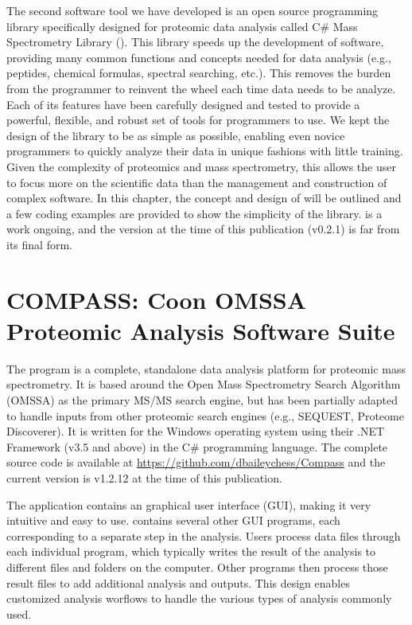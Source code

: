 The second software tool we have developed is an open source programming library specifically designed for proteomic data analysis called C\# Mass Spectrometry Library (\csmsl{}). This library speeds up the development of software, providing many common functions and concepts needed for data analysis (e.g., peptides, chemical formulas, spectral searching, etc.). This removes the burden from the programmer to reinvent the wheel each time data needs to be analyze. Each of its features have been carefully designed and tested to provide a powerful, flexible, and robust set of tools for programmers to use. We kept the design of the library to be as simple as possible, enabling even novice programmers to quickly analyze their data in unique fashions with little training. Given the complexity of proteomics and mass spectrometry, this allows the user to focus more on the scientific data than the management and construction of complex software. In this chapter, the concept and design of \csmsl{} will be outlined and a few coding examples are provided to show the simplicity of the library. \csmsl{} is a work ongoing, and the version at the time of this publication (v0.2.1) is far from its final form. 

\section{COMPASS: Coon OMSSA Proteomic Analysis Software Suite}
The \compass{} program is a complete, standalone data analysis platform for proteomic mass spectrometry. It is based around the Open Mass Spectrometry Search Algorithm (OMSSA) as the primary MS/MS search engine, but has been partially adapted to handle inputs from other proteomic search engines (e.g., SEQUEST, Proteome Discoverer).\cite{sequest} It is written for the Windows operating system using their .NET Framework (v3.5 and above) in the C\# programming language. The complete source code is available at \url{https://github.com/dbaileychess/Compass} and the current version is v1.2.12 at the time of this publication.

The application contains an graphical user interface (GUI), making it very intuitive and easy to use. \compass{}  contains several other GUI programs, each corresponding to a separate step in the analysis. Users process data files through each individual program, which typically writes the result of the analysis to different files and folders on the computer. Other programs then process those result files to add additional analysis and outputs. This design enables customized analysis worflows to handle the various types of analysis commonly used.

